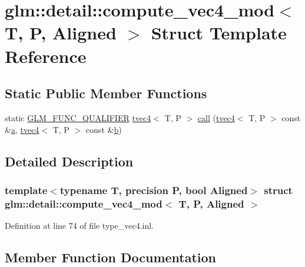 \hypertarget{structglm_1_1detail_1_1compute__vec4__mod}{}\section{glm\+::detail\+::compute\+\_\+vec4\+\_\+mod$<$ T, P, Aligned $>$ Struct Template Reference}
\label{structglm_1_1detail_1_1compute__vec4__mod}
\subsection*{Static Public Member Functions}
\begin{DoxyCompactItemize}
\item 
static \mbox{\hyperlink{setup_8hpp_a33fdea6f91c5f834105f7415e2a64407}{G\+L\+M\+\_\+\+F\+U\+N\+C\+\_\+\+Q\+U\+A\+L\+I\+F\+I\+ER}} \mbox{\hyperlink{structglm_1_1tvec4}{tvec4}}$<$ T, P $>$ \mbox{\hyperlink{structglm_1_1detail_1_1compute__vec4__mod_afb3c4f4634785c81bcafbee28cc56451}{call}} (\mbox{\hyperlink{structglm_1_1tvec4}{tvec4}}$<$ T, P $>$ const \&\mbox{\hyperlink{glad_8h_ac8729153468b5dcf13f971b21d84d4e5}{a}}, \mbox{\hyperlink{structglm_1_1tvec4}{tvec4}}$<$ T, P $>$ const \&\mbox{\hyperlink{glad_8h_a6eba317e3cf44d6d26c04a5a8f197dcb}{b}})
\end{DoxyCompactItemize}


\subsection{Detailed Description}
\subsubsection*{template$<$typename T, precision P, bool Aligned$>$\newline
struct glm\+::detail\+::compute\+\_\+vec4\+\_\+mod$<$ T, P, Aligned $>$}



Definition at line 74 of file type\+\_\+vec4.\+inl.



\subsection{Member Function Documentation}
\mbox{\label{structglm_1_1detail_1_1compute__vec4__mod_afb3c4f4634785c81bcafbee28cc56451}} 
